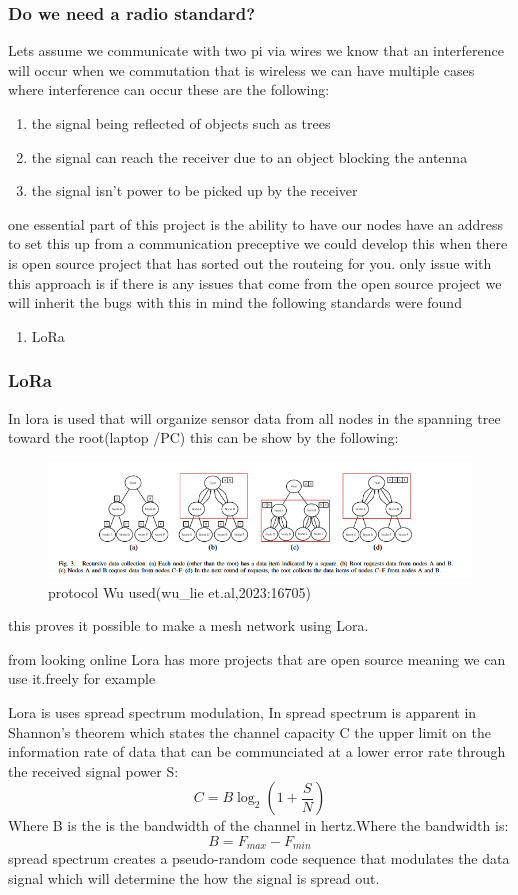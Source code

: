 \subsubsection{Do we need a radio standard?}
Lets assume we communicate with two pi via wires  we know that an interference will occur when  we  commutation that is wireless
we can have multiple cases where interference can  occur these are  the following:
\begin{enumerate}
    \item the signal being reflected of objects such as  trees
    \item the signal can reach the  receiver due to an object blocking the antenna
    \item the signal isn't  power to be picked up by the receiver
\end{enumerate}
one essential part of this project is the  ability to have  our nodes have an address to set this up
from a communication preceptive we could develop this when there is open source project that has sorted out the routeing for  you.
only issue with this approach is if there is any issues that come from the open source project we will inherit the bugs
with this in mind the following standards were found
\begin{enumerate}
    \item LoRa
\end{enumerate}
\subsubsection{LoRa}

In \cite{Wu_Liebeherr_2023} lora is used that will organize sensor
data from all nodes in the spanning tree toward the root(laptop /PC) this can be show by the  following:
\begin{figure}[h!]
    \centering
    \includegraphics[width=0.5\linewidth]{Images/lora_example_routing_proto.png}
    \caption{protocol Wu used(wu\_lie et.al,2023:16705)}
    \label{protocol Wu used(wu_lie et.al,2023:16705)}
\end{figure}  
this proves it possible  to make a  mesh network using Lora.
\par 
from looking online Lora has more projects that are open source meaning we can use it.freely for example 
\par
Lora is uses spread spectrum modulation, In \cite{2003_Information_2023} spread spectrum is apparent in Shannon's theorem which states the channel capacity C the upper limit on the information rate of data that can be communciated at a lower error rate through the received signal power S:
$$C=B\log_2(1+\frac{S}{N})$$
Where B is the is the bandwidth of the channel in hertz.Where the bandwidth is:
$$B=F_{max}-F_{min}$$
spread spectrum  creates a pseudo-random code sequence that modulates the data signal  which will determine the  how  the signal is  spread out.

